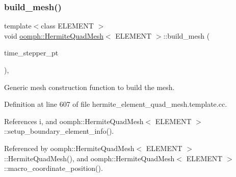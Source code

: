 \subsubsection{\texorpdfstring{build\+\_\+mesh()}{build\_mesh()}}
{\footnotesize\ttfamily template$<$class E\+L\+E\+M\+E\+NT $>$ \\
void \hyperlink{classoomph_1_1HermiteQuadMesh}{oomph\+::\+Hermite\+Quad\+Mesh}$<$ E\+L\+E\+M\+E\+NT $>$\+::build\+\_\+mesh (\begin{DoxyParamCaption}\item[{\hyperlink{classoomph_1_1TimeStepper}{Time\+Stepper} $\ast$}]{time\+\_\+stepper\+\_\+pt }\end{DoxyParamCaption})\hspace{0.3cm}{\ttfamily [private]}, {\ttfamily [virtual]}}



Generic mesh construction function to build the mesh. 



Definition at line 607 of file hermite\+\_\+element\+\_\+quad\+\_\+mesh.\+template.\+cc.



References i, and oomph\+::\+Hermite\+Quad\+Mesh$<$ E\+L\+E\+M\+E\+N\+T $>$\+::setup\+\_\+boundary\+\_\+element\+\_\+info().



Referenced by oomph\+::\+Hermite\+Quad\+Mesh$<$ E\+L\+E\+M\+E\+N\+T $>$\+::\+Hermite\+Quad\+Mesh(), and oomph\+::\+Hermite\+Quad\+Mesh$<$ E\+L\+E\+M\+E\+N\+T $>$\+::macro\+\_\+coordinate\+\_\+position().

\mbox{\label{classoomph_1_1HermiteQuadMesh_a17d8992ae7fa8b46b568d156306d3c89}} 
